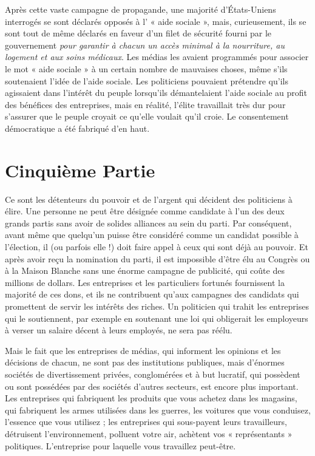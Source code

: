 Après cette vaste campagne de propagande, une majorité d'États-Uniens interrogés se sont déclarés opposés à l' « aide sociale », mais, curieusement, ils se sont tout de même déclarés en faveur d'un filet de sécurité fourni par le gouvernement \emph{pour garantir à chacun un accès minimal à la nourriture, au logement et aux soins médicaux}. Les médias les avaient programmés pour associer le mot « aide sociale » à un certain nombre de mauvaises choses, même s'ils soutenaient l'idée de l'aide sociale. Les politiciens pouvaient prétendre qu'ils agissaient dans l'intérêt du peuple lorsqu'ils démantelaient l'aide sociale au profit des bénéfices des entreprises, mais en réalité, l'élite travaillait très dur pour s'assurer que le peuple croyait ce qu'elle voulait qu'il croie. Le consentement démocratique a été fabriqué d'en haut.

\chapter*{\textbf{Cinquième Partie}}\hypertarget{cinquime-partie}{}\label{cinquime-partie}

Ce sont les détenteurs du pouvoir et de l'argent qui décident des politiciens à élire. Une personne ne peut être désignée comme candidate à l'un des deux grands partis sans avoir de solides alliances au sein du parti. Par conséquent, avant même que quelqu’un puisse être considéré comme un candidat possible à l'élection, il (ou parfois elle !) doit faire appel à ceux qui sont déjà au pouvoir. Et après avoir reçu la nomination du parti, il est impossible d'être élu au Congrès ou à la Maison Blanche sans une énorme campagne de publicité, qui coûte des millions de dollars. Les entreprises et les particuliers fortunés fournissent la majorité de ces dons, et ils ne contribuent qu'aux campagnes des candidats qui promettent de servir les intérêts des riches. Un politicien qui trahit les entreprises qui le soutiennent, par exemple en soutenant une loi qui obligerait les employeurs à verser un salaire décent à leurs employés, ne sera pas réélu.

Mais le fait que les entreprises de médias, qui informent les opinions et les décisions de chacun, ne sont pas des institutions publiques, mais d'énormes sociétés de divertissement privées, conglomérées et à but lucratif, qui possèdent ou sont possédées par des sociétés d'autres secteurs, est encore plus important. Les entreprises qui fabriquent les produits que vous achetez dans les magasins, qui fabriquent les armes utilisées dans les guerres, les voitures que vous conduisez, l'essence que vous utilisez ; les entreprises qui sous-payent leurs travailleurs, détruisent l'environnement, polluent votre air, achètent vos « représentants » politiques. L'entreprise pour laquelle vous travaillez peut-être.

